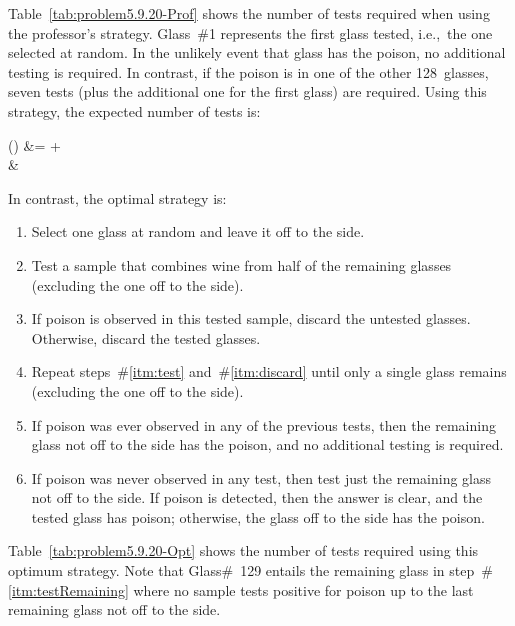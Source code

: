 Table~\ref{tab:problem5.9.20-Prof} shows the number of tests required when using the professor's strategy.  Glass~\#1 represents the first glass tested, i.e.,~the one selected at random.  In the unlikely event that glass has the poison, no additional testing is required. In contrast, if the poison is in one of the other 128~glasses, seven tests (plus the additional one for the first glass) are required.  Using this strategy, the expected number of tests is:

\begin{aligncustom}
  () &=   +   \\
                                          &\approx {}
\end{aligncustom}


In contrast, the optimal strategy is:
\vspace{-1.25em}
\begin{enumerate}[leftmargin=1.35cm]
  \setlength\itemsep{0em}
  \item Select one glass at random and leave it off to the side.
  \item\label{itm:test} Test a sample that combines wine from half of the remaining glasses (excluding the one off to the side).
  \item\label{itm:discard} If poison is observed in this tested sample, discard the untested glasses.  Otherwise, discard the tested glasses.
  \item Repeat steps~\#\ref{itm:test} and~\#\ref{itm:discard} until only a single glass remains (excluding the one off to the side).
  \item If poison was ever observed in any of the previous tests, then the remaining glass not off to the side has the poison, and no additional testing is required.
  \item\label{itm:testRemaining} If poison was never observed in any test, then test just the remaining glass not off to the side. If poison is detected, then the answer is clear, and the tested glass has poison; otherwise, the glass off to the side has the poison.
\end{enumerate}

Table~\ref{tab:problem5.9.20-Opt} shows the number of tests required using this optimum strategy.    Note that Glass\#~129 entails the remaining glass in step~\#\ref{itm:testRemaining} where no sample tests positive for poison up to the last remaining glass not off to the side.

